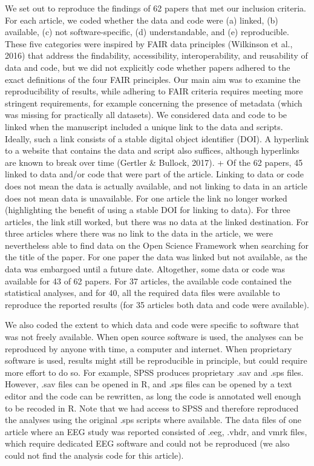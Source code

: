 \documentclass[,jou, a4paper,floatsintext]{apa6}
\begin{document}
We set out to reproduce the findings of 62 papers that met our inclusion criteria. For each article, we coded whether the data and code were (a) linked, (b) available, (c) not software-specific, (d) understandable, and (e) reproducible. These five categories were inspired by FAIR data principles (Wilkinson et al., 2016) that address the findability, accessibility, interoperability, and reusability of data and code, but we did not explicitly code whether papers adhered to the exact definitions of the four FAIR principles. Our main aim was to examine the reproducibility of results, while adhering to FAIR criteria requires meeting more stringent requirements, for example concerning the presence of metadata (which was missing for practically all datasets). We considered data and code to be linked when the manuscript included a unique link to the data and scripts. Ideally, such a link consists of a stable digital object identifier (DOI). A hyperlink to a website that contains the data and script also suffices, although hyperlinks are known to break over time (Gertler \& Bullock, 2017).
+
Of the 62 papers, 45 linked to data and/or code that were part of the article. Linking to data or code does not mean the data is actually available, and not linking to data in an article does not mean data is unavailable. For one article the link no longer worked (highlighting the benefit of using a stable DOI for linking to data). For three articles, the link still worked, but there was no data at the linked destination. For three articles where there was no link to the data in the article, we were nevertheless able to find data on the Open Science Framework when searching for the title of the paper. For one paper the data was linked but not available, as the data was embargoed until a future date. Altogether, some data or code was available for 43 of 62 papers. For 37 articles, the available code contained the statistical analyses, and for 40, all the required data files were available to reproduce the reported results (for 35 articles both data and code were available).

We also coded the extent to which data and code were specific to software that was not freely available. When open source software is used, the analyses can be reproduced by anyone with time, a computer and internet. When proprietary software is used, results might still be reproducible in principle, but could require more effort to do so. For example, SPSS produces proprietary .sav and .sps files. However, .sav files can be opened in R, and .sps files can be opened by a text editor and the code can be rewritten, as long the code is annotated well enough to be recoded in R. Note that we had access to SPSS and therefore reproduced the analyses using the original .sps scripts where available. The data files of one article where an EEG study was reported consisted of .eeg, .vhdr, and vmrk files, which require dedicated EEG software and could not be reproduced (we also could not find the analysis code for this article).
\end{document}
